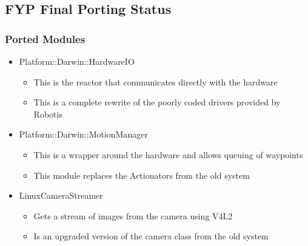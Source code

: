 \documentclass{beamer}
\begin{document}
\subsection{FYP Final Porting Status}
\begin{frame}
	\frametitle{Ported Modules}
	\begin{itemize}
		\item Platform::Darwin::HardwareIO
			\begin{itemize}
				\item This is the reactor that communicates directly with the hardware
				\item This is a complete rewrite of the poorly coded drivers provided by Robotis
			\end{itemize}
		
		\item Platform::Darwin::MotionManager
			\begin{itemize}
				\item This is a wrapper around the hardware and allows queuing of waypoints
				\item This module replaces the Actionators from the old system
			\end{itemize}
		
		\item LinuxCameraStreamer
			\begin{itemize}
				\item Gets a stream of images from the camera using V4L2
				\item Is an upgraded version of the camera class from the old system
			\end{itemize}
		\end{itemize}
\end{frame}
\end{document}
